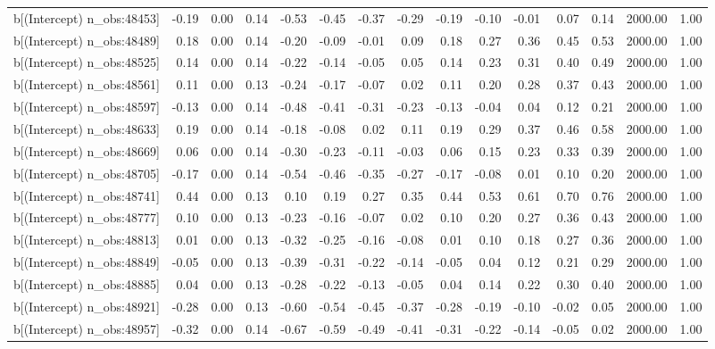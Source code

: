 \begin{table}[ht]
\begin{tabular}{rrrrrrrrrrrrrrr}
  b[(Intercept) n\_obs:48453] & -0.19 & 0.00 & 0.14 & -0.53 & -0.45 & -0.37 & -0.29 & -0.19 & -0.10 & -0.01 & 0.07 & 0.14 & 2000.00 & 1.00 \\ 
  b[(Intercept) n\_obs:48489] & 0.18 & 0.00 & 0.14 & -0.20 & -0.09 & -0.01 & 0.09 & 0.18 & 0.27 & 0.36 & 0.45 & 0.53 & 2000.00 & 1.00 \\ 
  b[(Intercept) n\_obs:48525] & 0.14 & 0.00 & 0.14 & -0.22 & -0.14 & -0.05 & 0.05 & 0.14 & 0.23 & 0.31 & 0.40 & 0.49 & 2000.00 & 1.00 \\ 
  b[(Intercept) n\_obs:48561] & 0.11 & 0.00 & 0.13 & -0.24 & -0.17 & -0.07 & 0.02 & 0.11 & 0.20 & 0.28 & 0.37 & 0.43 & 2000.00 & 1.00 \\ 
  b[(Intercept) n\_obs:48597] & -0.13 & 0.00 & 0.14 & -0.48 & -0.41 & -0.31 & -0.23 & -0.13 & -0.04 & 0.04 & 0.12 & 0.21 & 2000.00 & 1.00 \\ 
  b[(Intercept) n\_obs:48633] & 0.19 & 0.00 & 0.14 & -0.18 & -0.08 & 0.02 & 0.11 & 0.19 & 0.29 & 0.37 & 0.46 & 0.58 & 2000.00 & 1.00 \\ 
  b[(Intercept) n\_obs:48669] & 0.06 & 0.00 & 0.14 & -0.30 & -0.23 & -0.11 & -0.03 & 0.06 & 0.15 & 0.23 & 0.33 & 0.39 & 2000.00 & 1.00 \\ 
  b[(Intercept) n\_obs:48705] & -0.17 & 0.00 & 0.14 & -0.54 & -0.46 & -0.35 & -0.27 & -0.17 & -0.08 & 0.01 & 0.10 & 0.20 & 2000.00 & 1.00 \\ 
  b[(Intercept) n\_obs:48741] & 0.44 & 0.00 & 0.13 & 0.10 & 0.19 & 0.27 & 0.35 & 0.44 & 0.53 & 0.61 & 0.70 & 0.76 & 2000.00 & 1.00 \\ 
  b[(Intercept) n\_obs:48777] & 0.10 & 0.00 & 0.13 & -0.23 & -0.16 & -0.07 & 0.02 & 0.10 & 0.20 & 0.27 & 0.36 & 0.43 & 2000.00 & 1.00 \\ 
  b[(Intercept) n\_obs:48813] & 0.01 & 0.00 & 0.13 & -0.32 & -0.25 & -0.16 & -0.08 & 0.01 & 0.10 & 0.18 & 0.27 & 0.36 & 2000.00 & 1.00 \\ 
  b[(Intercept) n\_obs:48849] & -0.05 & 0.00 & 0.13 & -0.39 & -0.31 & -0.22 & -0.14 & -0.05 & 0.04 & 0.12 & 0.21 & 0.29 & 2000.00 & 1.00 \\ 
  b[(Intercept) n\_obs:48885] & 0.04 & 0.00 & 0.13 & -0.28 & -0.22 & -0.13 & -0.05 & 0.04 & 0.14 & 0.22 & 0.30 & 0.40 & 2000.00 & 1.00 \\ 
  b[(Intercept) n\_obs:48921] & -0.28 & 0.00 & 0.13 & -0.60 & -0.54 & -0.45 & -0.37 & -0.28 & -0.19 & -0.10 & -0.02 & 0.05 & 2000.00 & 1.00 \\ 
  b[(Intercept) n\_obs:48957] & -0.32 & 0.00 & 0.14 & -0.67 & -0.59 & -0.49 & -0.41 & -0.31 & -0.22 & -0.14 & -0.05 & 0.02 & 2000.00 & 1.00 \\ 

\end{tabular}
\end{table}
